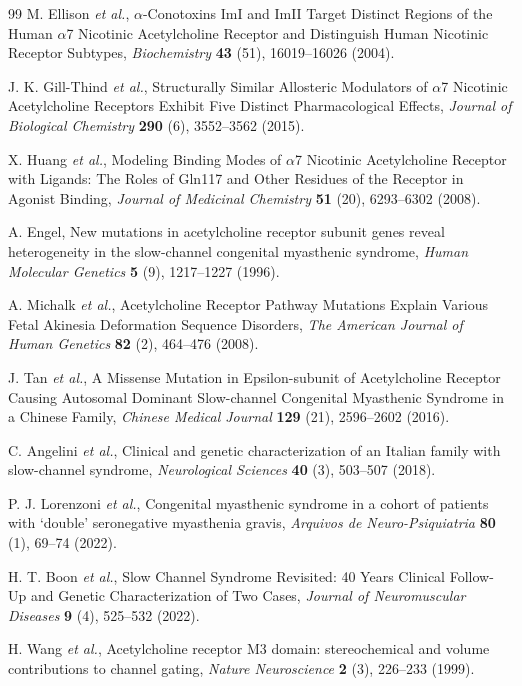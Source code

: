 \documentclass{ws-procs11x85}
\begin{document}
\begin{thebibliography}{99}
M. Ellison {\em et al.}, $\alpha$-Conotoxins ImI and ImII Target Distinct Regions of the Human $\alpha$7 Nicotinic Acetylcholine Receptor and Distinguish Human Nicotinic Receptor Subtypes, {\em Biochemistry} {\bf 43} (51), 16019--16026 (2004).

J. K. Gill-Thind {\em et al.}, Structurally Similar Allosteric Modulators of $\alpha$7 Nicotinic Acetylcholine Receptors Exhibit Five Distinct Pharmacological Effects, {\em Journal of Biological Chemistry} {\bf 290} (6), 3552--3562 (2015).

X. Huang {\em et al.}, Modeling Binding Modes of $\alpha$7 Nicotinic Acetylcholine Receptor with Ligands: The Roles of Gln117 and Other Residues of the Receptor in Agonist Binding, {\em Journal of Medicinal Chemistry} {\bf 51} (20), 6293--6302 (2008).

A. Engel, New mutations in acetylcholine receptor subunit genes reveal heterogeneity in the slow-channel congenital myasthenic syndrome, {\em Human Molecular Genetics} {\bf 5} (9), 1217--1227 (1996).

A. Michalk {\em et al.}, Acetylcholine Receptor Pathway Mutations Explain Various Fetal Akinesia Deformation Sequence Disorders, {\em The American Journal of Human Genetics} {\bf 82} (2), 464--476 (2008).

J. Tan {\em et al.}, A Missense Mutation in Epsilon-subunit of Acetylcholine Receptor Causing Autosomal Dominant Slow-channel Congenital Myasthenic Syndrome in a Chinese Family, {\em Chinese Medical Journal} {\bf 129} (21), 2596--2602 (2016).

C. Angelini {\em et al.}, Clinical and genetic characterization of an Italian family with slow-channel syndrome, {\em Neurological Sciences} {\bf 40} (3), 503--507 (2018).

P. J. Lorenzoni {\em et al.}, Congenital myasthenic syndrome in a cohort of patients with `double' seronegative myasthenia gravis, {\em Arquivos de Neuro-Psiquiatria} {\bf 80} (1), 69--74 (2022).

H. T. Boon {\em et al.}, Slow Channel Syndrome Revisited: 40 Years Clinical Follow-Up and Genetic Characterization of Two Cases, {\em Journal of Neuromuscular Diseases} {\bf 9} (4), 525--532 (2022).

H. Wang {\em et al.}, Acetylcholine receptor M3 domain: stereochemical and volume contributions to channel gating, {\em Nature Neuroscience} {\bf 2} (3), 226--233 (1999).


\end{thebibliography}
\end{document}
